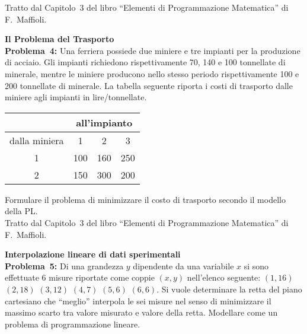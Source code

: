 \documentclass[11pt]{article}
\begin{document}
Tratto dal Capitolo~3
del libro ``Elementi di Programmazione Matematica'' 
di F.~Maffioli.\\

\bigskip


{\large \bf Il Problema del Trasporto}\\

{\sc \bf Problema~4\/:}
Una ferriera possiede due miniere e tre impianti
per la produzione di acciaio.
Gli impianti richiedono rispettivamente 70, 140 e 100
tonnellate di minerale,
mentre le miniere producono nello stesso periodo
rispettivamente 100 e 200 tonnellate di minerale.
La tabella seguente riporta i costi di trasporto
dalle miniere agli impianti in lire/tonnellate.

\begin{center}
\begin{tabular}{|c|c|c|c|} \hline
   & \multicolumn{3}{|c|}{all'impianto} \\
\hline
   dalla miniera & 1 & 2 & 3 \\
\hline
   1 & 100 & 160 & 250 \\
   2 & 150 & 300 & 200 \\ 
\hline

\end{tabular}
\end{center}

Formulare il problema di minimizzare
il costo di trasporto
secondo il modello della PL.\\

Tratto dal Capitolo~3
del libro ``Elementi di Programmazione Matematica'' 
di F.~Maffioli.\\

\bigskip


{\large \bf Interpolazione lineare di dati sperimentali}\\

{\sc \bf Problema~5\/:}
Di una grandezza $y$ dipendente da una variabile $x$
si sono effettuate 6 misure riportate come coppie $(x,y)$
nell'elenco seguente:
$(1,16)$ $(2,18)$ $(3,12)$ $(4,7)$ $(5,6)$ $(6,6)$.
Si vuole determinare la retta del piano cartesiano
che ``meglio'' interpola le sei misure
nel senso di minimizzare il massimo scarto 
tra valore misurato e valore della retta.
Modellare come un problema di programmazione lineare.\\  
\end{document}
